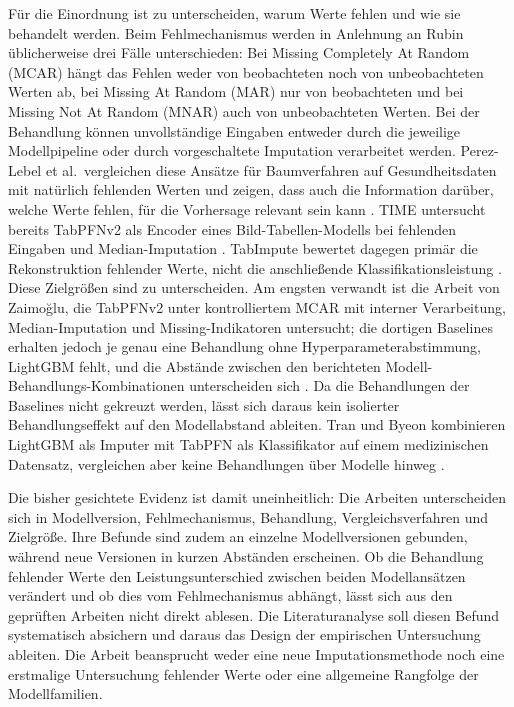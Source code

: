 \documentclass[12pt,a4paper]{article}
\begin{document}
Für die Einordnung ist zu unterscheiden, warum Werte fehlen und wie
sie behandelt werden. Beim Fehlmechanismus werden in Anlehnung an
Rubin \cite{rubin_inference_1976} üblicherweise drei Fälle
unterschieden: Bei Missing Completely At Random (MCAR) hängt das
Fehlen weder von beobachteten noch von unbeobachteten Werten ab, bei
Missing At Random (MAR) nur von beobachteten und bei Missing Not At
Random (MNAR) auch von unbeobachteten Werten. Bei der Behandlung
können unvollständige Eingaben entweder durch die jeweilige
Modellpipeline oder durch vorgeschaltete Imputation verarbeitet
werden.
Perez-Lebel et al.\ vergleichen diese Ansätze für Baumverfahren auf
Gesundheitsdaten mit natürlich fehlenden Werten und zeigen, dass auch
die Information darüber, welche Werte fehlen, für die Vorhersage
relevant sein kann
\cite{perez_benchmarking_2022}. TIME untersucht bereits TabPFNv2 als
Encoder eines Bild-Tabellen-Modells bei fehlenden Eingaben und
Median-Imputation \cite[Abschnitte 4.3--4.4]{luo_time_2025}.
TabImpute bewertet dagegen primär die Rekonstruktion fehlender Werte,
nicht die anschließende Klassifikationsleistung
\cite[Abschnitt 4]{feitelberg_pipeline_2026}.
Diese Zielgrößen sind zu unterscheiden.
Am engsten verwandt ist die Arbeit von Zaimo\u{g}lu, die TabPFNv2
unter kontrolliertem
MCAR mit interner Verarbeitung, Median-Imputation und
Missing-Indikatoren untersucht; die dortigen Baselines erhalten jedoch je genau
eine Behandlung ohne Hyperparameterabstimmung, LightGBM fehlt, und die
Abstände zwischen den berichteten Modell-Behandlungs-Kombinationen
unterscheiden sich \cite[Tabelle II]{zaimoglu_tabpfn_2026}. Da die
Behandlungen der Baselines nicht gekreuzt werden, lässt sich daraus
kein isolierter Behandlungseffekt auf den Modellabstand ableiten.
Tran und Byeon kombinieren LightGBM als Imputer mit TabPFN als
Klassifikator auf einem medizinischen Datensatz, vergleichen aber keine
Behandlungen über Modelle hinweg \cite{tran_predicting_2024}.

Die bisher gesichtete Evidenz ist damit uneinheitlich: Die Arbeiten
unterscheiden sich in Modellversion, Fehlmechanismus,
Behandlung, Vergleichsverfahren und Zielgröße. Ihre Befunde sind
zudem an einzelne Modellversionen gebunden, während neue Versionen in
kurzen Abständen erscheinen. Ob die Behandlung fehlender Werte den
Leistungsunterschied zwischen beiden Modellansätzen verändert
und ob dies vom Fehlmechanismus abhängt, lässt sich aus den
geprüften Arbeiten nicht direkt ablesen. Die Literaturanalyse soll
diesen Befund systematisch absichern und daraus das Design der
empirischen Untersuchung ableiten. Die Arbeit beansprucht weder eine
neue Imputationsmethode noch eine erstmalige Untersuchung fehlender
Werte oder eine allgemeine Rangfolge der Modellfamilien.
\end{document}
